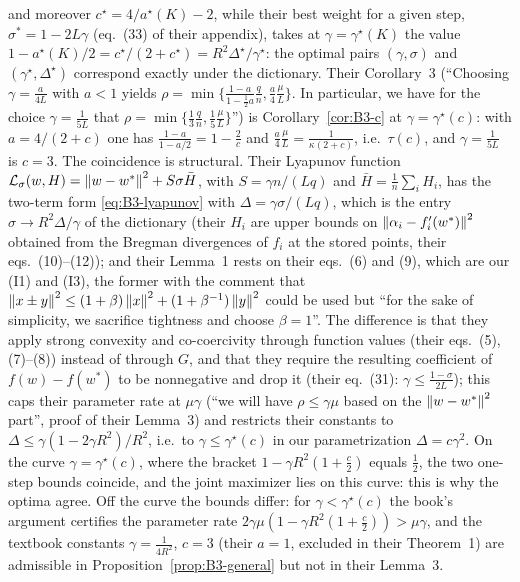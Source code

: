 and moreover $c^\star=4/a^\star(K)-2$, while their best weight for a given step, $\sigma^\ast=1-2L\gamma$ (eq.~(33) of their appendix), takes at $\gamma=\gamma^\star(K)$ the value $1-a^\star(K)/2=c^\star/(2+c^\star)=R^2\Delta^\star/\gamma^\star$: the optimal pairs $(\gamma,\sigma)$ and $(\gamma^\star,\Delta^\star)$ correspond exactly under the dictionary. Their Corollary~3 (``Choosing $\gamma=\frac{a}{4L}$ with $a<1$ yields $\rho=\min\{\frac{1-a}{1-\frac12a}\frac qn,\frac a4\frac\mu L\}$. In particular, we have for the choice $\gamma=\frac1{5L}$ that $\rho=\min\{\frac13\frac qn,\frac15\frac\mu L\}$'') is Corollary~\ref{cor:B3-c} at $\gamma=\gamma^\star(c)$: with $a=4/(2+c)$ one has $\frac{1-a}{1-a/2}=1-\frac2c$ and $\frac a4\frac\mu L=\frac1{\kappa(2+c)}$, i.e.\ $\tau(c)$, and $\gamma=\frac1{5L}$ is $c=3$. The coincidence is structural. Their Lyapunov function $\mathcal L_\sigma(w,H)=\left\|w-w^\ast\right\|^2+S\sigma\bar H$, with $S=\gamma n/(Lq)$ and $\bar H=\frac1n\sum_iH_i$, has the two-term form \eqref{eq:B3-lyapunov} with $\Delta=\gamma\sigma/(Lq)$, which is the entry $\sigma\to R^2\Delta/\gamma$ of the dictionary (their $H_i$ are upper bounds on $\left\|\alpha_i-f_i'(w^\ast)\right\|^2$ obtained from the Bregman divergences of $f_i$ at the stored points, their eqs.~(10)--(12)); and their Lemma~1 rests on their eqs.~(6) and (9), which are our (I1) and (I3), the former with the comment that $\left\|x\pm y\right\|^2\le(1+\beta)\left\|x\right\|^2+(1+\beta^{-1})\left\|y\right\|^2$ could be used but ``for the sake of simplicity, we sacrifice tightness and choose $\beta=1$''. The difference is that they apply strong convexity and co-coercivity through function values (their eqs.~(5), (7)--(8)) instead of through $G$, and that they require the resulting coefficient of $f(w)-f(w^\ast)$ to be nonnegative and drop it (their eq.~(31): $\gamma\le\frac{1-\sigma}{2L}$); this caps their parameter rate at $\mu\gamma$ (``we will have $\rho\le\gamma\mu$ based on the $\left\|w-w^\ast\right\|^2$ part'', proof of their Lemma~3) and restricts their constants to $\Delta\le\gamma(1-2\gamma R^2)/R^2$, i.e.\ to $\gamma\le\gamma^\star(c)$ in our parametrization $\Delta=c\gamma^2$. On the curve $\gamma=\gamma^\star(c)$, where the bracket $1-\gamma R^2(1+\frac c2)$ equals $\frac12$, the two one-step bounds coincide, and the joint maximizer lies on this curve: this is why the optima agree. Off the curve the bounds differ: for $\gamma<\gamma^\star(c)$ the book's argument certifies the parameter rate $2\gamma\mu(1-\gamma R^2(1+\frac c2))>\mu\gamma$, and the textbook constants $\gamma=\frac1{4R^2}$, $c=3$ (their $a=1$, excluded in their Theorem~1) are admissible in Proposition~\ref{prop:B3-general} but not in their Lemma~3.

